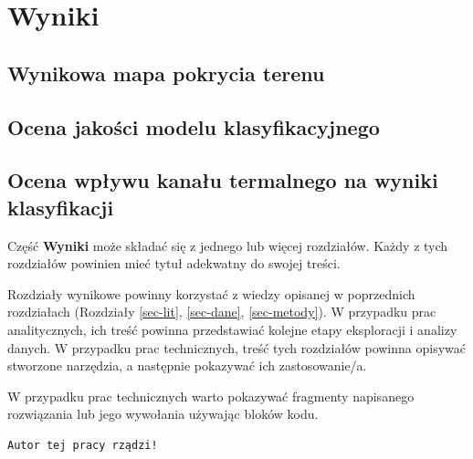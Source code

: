 \documentclass{amuthesis}
\begin{document}

\hypertarget{sec-wyniki}{%
\chapter{Wyniki}\label{sec-wyniki}}

\hypertarget{sec-mapa}{%
\section{Wynikowa mapa pokrycia terenu}\label{sec-mapa}}

\hypertarget{sec-ocena}{%
\section{Ocena jakości modelu klasyfikacyjnego}\label{sec-ocena}}

\hypertarget{sec-wplyw}{%
\section{Ocena wpływu kanału termalnego na wyniki
klasyfikacji}\label{sec-wplyw}}

Część \textbf{Wyniki} może składać się z jednego lub więcej rozdziałów.
Każdy z tych rozdziałów powinien mieć tytuł adekwatny do swojej treści.

Rozdziały wynikowe powinny korzystać z wiedzy opisanej w poprzednich
rozdziałach (Rozdziały \ref{sec-lit}, \ref{sec-dane}, \ref{sec-metody}).
W przypadku prac analitycznych, ich treść powinna przedstawiać kolejne
etapy eksploracji i analizy danych. W przypadku prac technicznych, treść
tych rozdziałów powinna opisywać stworzone narzędzia, a następnie
pokazywać ich zastosowanie/a.

W przypadku prac technicznych warto pokazywać fragmenty napisanego
rozwiązania lub jego wywołania używając bloków kodu.

\begin{Shaded}
\begin{Highlighting}[]
\OtherTok{=} 
  \NormalTok{)}
\NormalTok{\}}
\NormalTok{(}\NormalTok{)}
\end{Highlighting}
\end{Shaded}

\begin{verbatim}
Autor tej pracy rządzi!
\end{verbatim}
\end{document}
